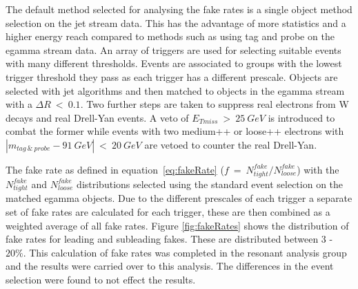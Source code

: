 The default method selected for analysing the fake rates is a single object method selection on the jet stream data. This has the advantage of more statistics and a higher energy reach compared to methods such as using tag and probe on the egamma stream data.
An array of triggers are used for selecting suitable events with many different thresholds. 
Events are associated to groups with the lowest trigger threshold they pass as each trigger has a different prescale. Objects are selected with jet algorithms and then matched to objects in the egamma stream with a $\Delta R~<~0.1$. Two further steps are taken to suppress real electrons from W decays and real Drell-Yan events. A veto of $E_{Tmiss}~>~25~GeV$ is introduced to combat the former while events with two medium++ or loose++ electrons with $|m_{tag~\&~probe}-91~GeV|~<~20~GeV$ are vetoed to counter the real Drell-Yan.

The fake rate as defined in equation~\ref{eq:fakeRate} ($f~=~N^{fake}_{tight}/N^{fake}_{loose}$) with the $N^{fake}_{tight}$ and $N^{fake}_{loose}$ distributions selected using the standard event selection on the matched egamma objects.
Due to the different prescales of each trigger a separate set of fake rates are calculated for each trigger, these are then combined as a weighted average of all fake rates. Figure \ref{fig:fakeRates} shows the distribution of fake rates for leading and subleading fakes. These are distributed between 3 - $20\%$. This calculation of fake rates was completed in the resonant analysis group and the results were carried over to this analysis. The differences in the event selection were found to not effect the results.

